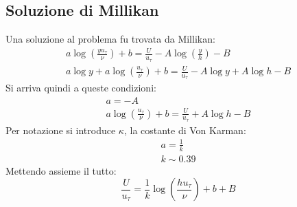 \subsection{Soluzione di Millikan}
Una soluzione al problema fu trovata da Millikan:
%
	\begin{equation*}
		\begin{gathered}
			a \log{\left( \frac{y u_\tau}{\nu} \right)} + b = \frac{U}{u_\tau} - A \log{\left( \frac{y}{h} \right)} - B\\
			a \log{y} + a \log{\left( \frac{u_\tau}{\nu} \right)} + b = \frac{U}{u_\tau} - A \log{y} + A \log{h} - B
		\end{gathered}
	\end{equation*}
%
Si arriva quindi a queste condizioni:
%
	\begin{equation*}
		\begin{gathered}
			a = -A\\
			a \log{\left( \frac{u_\tau}{\nu} \right)} + b = \frac{U}{u_\tau} + A \log{h} - B
		\end{gathered}
	\end{equation*}
%
Per notazione si introduce $\kappa$, la costante di Von Karman:
%
	\begin{equation*}
		\begin{gathered}
			a = \frac{1}{k}\\
			k \sim 0.39
		\end{gathered}
	\end{equation*}
%
Mettendo assieme il tutto:
%
	\begin{equation*}
		\frac{U}{u_\tau} = \frac{1}{k} \log{\left( \frac{h u_\tau}{\nu} \right)} + b + B
	\end{equation*}
%


